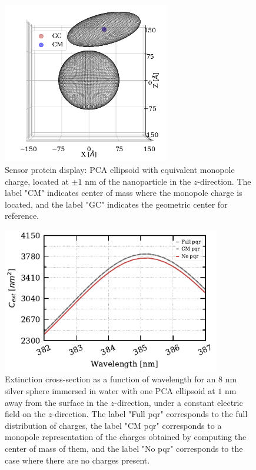 \begin{figure}%
    \centering
    \includegraphics[width=0.65\textwidth]{viz/one_pca_cm_gc_display.png} 
    \caption{Sensor protein display: PCA ellipsoid with equivalent monopole charge, located at $\pm 1$ nm of the 
    nanoparticle in the $z$-direction. The label "CM" indicates center of mass where the monopole charge is located, and
    the label "GC" indicates the geometric center for reference.}
    \label{fig:one_pca_cm_sketch}
 \end{figure}



\begin{figure}%
    \centering
    \includegraphics[width=0.85\textwidth]{pqr_analysis_pca.pdf} 
    \caption{Extinction cross-section as a function of wavelength for an $8$ nm
    silver sphere immersed in water with one PCA ellipsoid at $1$ nm away from 
    the surface in the $z$-direction, under a constant electric field on the $z$-direction.
    The label "Full pqr" corresponds to the full distribution of charges, the label "CM pqr" corresponds to a monopole representation 
    of the charges obtained by computing the center of mass of them, and the label "No pqr" 
    corresponds to the case where there are no charges present.}
    \label{fig:pqr_pca}
 \end{figure}

